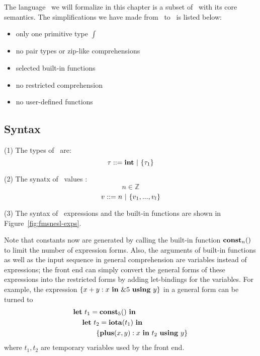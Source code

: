 \section{\fmsnesl}

The language \fmsnesl \ we will formalize in this chapter is a subset of \mysnesl \ with its core semantics. 
The simplifications we have made from \mysnesl \  to \fmsnesl \ is listed below:
\begin{itemize}
	\item only one primitive type $\int$ 
	\item no pair types or zip-like comprehensions
	\item selected built-in functions 
	\item no restricted comprehension
	\item no user-defined functions
\end{itemize}


\subsection{Syntax}

\noindent (1) The types of \fmsnesl \ are: 
$$\tau ::= \int \ | \ \tseq{\tau_1}$$

\noindent (2) The synatx of \fmsnesl \ values : 
$$ n \in \mathbb{Z} $$
$$ v::= n \ | \ \{\replc{l}{v}\}$$

\noindent (3) The syntax of \fmsnesl \ expressions and the built-in functions are shown in Figure~\ref{fig:fmsnesl-exps}. 




Note that constants now are generated by calling the built-in function $\constn{n}()$ to limit the number of expression forms.
Also, the arguments of built-in functions as well as the input sequence in general comprehension are variables instead of expressions; the front end can simply convert the general forms of these expressions into the restricted forms by adding let-bindings for the variables. 
For example, the expression $\Comp{x+y}{x}{\&5}{y}$ in a general form can be turned to
\begin{alignat*}{2}
\*{let} & \ t_1 = \const{5} \ \*{in} \\
& \*{let} \ t_2 =  \iota{t_1} \ \*{in} \\
& \qquad \{ \plus{x}{y} :  x \ \*{in} \ t_2 \ \*{using}  \ y \}
\end{alignat*} 
where $t_1, t_2$ are temporary variables used by the front end.



